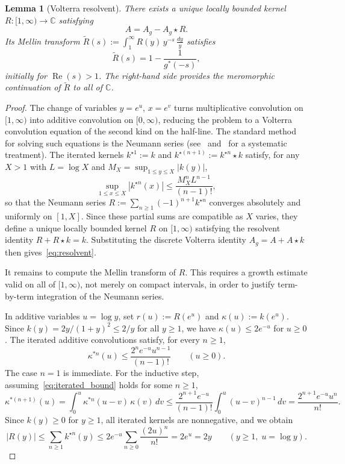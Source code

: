 \documentclass[11pt]{amsart}
\newtheorem{lemma}[theorem]{Lemma}
\theoremstyle{definition}
\theoremstyle{remark}
\newcommand{\Real}{\operatorname{Re}}
\begin{document}
\begin{lemma}[Volterra resolvent]\label{lem:resolvent}
There exists a unique locally bounded kernel $R : [1,\infty) \to \mathbb{C}$ satisfying
\begin{equation}\label{eq:resolvent}
A = A_g - A_g \star R.
\end{equation}
Its Mellin transform $\widetilde{R}(s) := \int_1^\infty R(y)\, y^{-s}\, \frac{dy}{y}$ satisfies
\begin{equation}\label{eq:Rtilde}
\widetilde{R}(s) = 1 - \frac{1}{g^*(-s)},
\end{equation}
initially for $\Real(s) > 1$. The right-hand side provides the meromorphic continuation of $\widetilde{R}$ to all of $\mathbb{C}$.
\end{lemma}

\begin{proof}
The change of variables $y = e^u$, $x = e^v$ turns multiplicative convolution on $[1,\infty)$ into additive convolution on $[0,\infty)$, reducing the problem to a Volterra convolution equation of the second kind on the half-line. The standard method for solving such equations is the Neumann series (see~\cite[Chapter~2, \S2.3]{GripenbergLondenStaffans} and~\cite{Wang} for a systematic treatment). The iterated kernels $k^{\star 1} := k$ and $k^{\star(n+1)} := k^{\star n} \star k$ satisfy, for any $X > 1$ with $L = \log X$ and $M_X = \sup_{1 \leq y \leq X} |k(y)|$,
$$
\sup_{1 \leq x \leq X} |k^{\star n}(x)| \leq \frac{M_X^n L^{n-1}}{(n-1)!},
$$
so that the Neumann series $R := \sum_{n \geq 1} (-1)^{n+1} k^{\star n}$ converges absolutely and uniformly on $[1,X]$. Since these partial sums are compatible as $X$ varies, they define a unique locally bounded kernel $R$ on $[1,\infty)$ satisfying the resolvent identity $R + R \star k = k$. Substituting the discrete Volterra identity $A_g = A + A\star k$ then gives~\eqref{eq:resolvent}.

It remains to compute the Mellin transform of $R$. This requires a growth estimate valid on all of $[1,\infty)$, not merely on compact intervals, in order to justify term-by-term integration of the Neumann series.

In additive variables $u = \log y$, set $r(u) := R(e^u)$ and $\kappa(u) := k(e^u)$. Since $k(y) = 2y/(1+y)^2 \leq 2/y$ for all $y \geq 1$, we have $\kappa(u) \leq 2e^{-u}$ for $u \geq 0$. The iterated additive convolutions satisfy, for every $n \geq 1$,
\begin{equation}\label{eq:iterated_bound}
\kappa^{*n}(u) \leq \frac{2^n e^{-u} u^{n-1}}{(n-1)!} \qquad (u \geq 0).
\end{equation}
The case $n = 1$ is immediate. For the inductive step, assuming~\eqref{eq:iterated_bound} holds for some $n \geq 1$,
$$
\kappa^{*(n+1)}(u) = \int_0^u \kappa^{*n}(u-v)\, \kappa(v)\, dv \leq \frac{2^{n+1} e^{-u}}{(n-1)!} \int_0^u (u-v)^{n-1}\, dv = \frac{2^{n+1} e^{-u} u^n}{n!}.
$$
Since $k(y) \geq 0$ for $y \geq 1$, all iterated kernels are nonnegative, and we obtain
\begin{equation}\label{eq:R_global}
|R(y)| \leq \sum_{n \geq 1} k^{\star n}(y) \leq 2e^{-u} \sum_{n \geq 0} \frac{(2u)^n}{n!} = 2e^u = 2y \qquad (y \geq 1,\; u = \log y).
\end{equation}


\end{proof}
\end{document}
